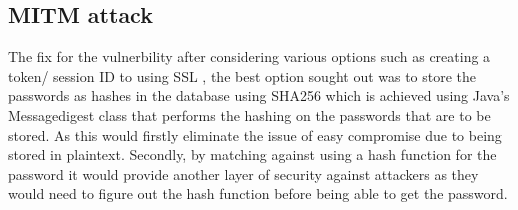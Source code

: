 \documentclass[10pt]{article}
\begin{document}
        \subsection{MITM attack}

          The fix for the vulnerbility after considering various options such as  creating a token/ session ID to using SSL , the best option sought out was to store the passwords as hashes in the database using SHA256 which is achieved using Java's Messagedigest class that performs the hashing on the passwords that are to be stored. As this would firstly eliminate the issue of easy compromise due to being stored in plaintext. Secondly, by matching against using a hash function for the password it would provide another layer of security against attackers as they would need to figure out the hash function before being able to get the password.
\end{document}
